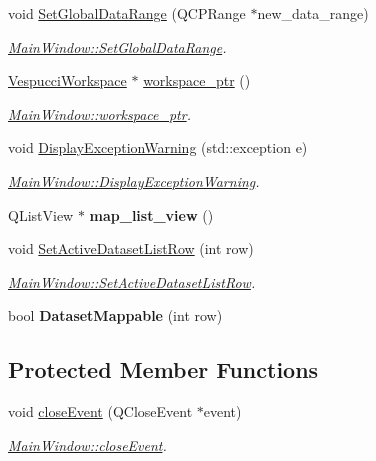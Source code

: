 \begin{DoxyCompactItemize}
void \hyperlink{class_main_window_aa0c431f17d5790a5bfc0e49e429c173b}{Set\+Global\+Data\+Range} (Q\+C\+P\+Range $\ast$new\+\_\+data\+\_\+range)
\begin{DoxyCompactList}\small\item\em \hyperlink{class_main_window_aa0c431f17d5790a5bfc0e49e429c173b}{Main\+Window\+::\+Set\+Global\+Data\+Range}. \end{DoxyCompactList}\item 
\hyperlink{class_vespucci_workspace}{Vespucci\+Workspace} $\ast$ \hyperlink{class_main_window_af78d7dca13e15077306eb27737edb096}{workspace\+\_\+ptr} ()
\begin{DoxyCompactList}\small\item\em \hyperlink{class_main_window_af78d7dca13e15077306eb27737edb096}{Main\+Window\+::workspace\+\_\+ptr}. \end{DoxyCompactList}\item 
void \hyperlink{class_main_window_afe21228ed02306f34b6194cefeeb7feb}{Display\+Exception\+Warning} (std\+::exception e)
\begin{DoxyCompactList}\small\item\em \hyperlink{class_main_window_afe21228ed02306f34b6194cefeeb7feb}{Main\+Window\+::\+Display\+Exception\+Warning}. \end{DoxyCompactList}\item 
\hypertarget{class_main_window_a7a13630a02a40927bfb218078c586f9f}{Q\+List\+View $\ast$ {\bfseries map\+\_\+list\+\_\+view} ()}\label{class_main_window_a7a13630a02a40927bfb218078c586f9f}

\item 
void \hyperlink{class_main_window_a2961ddb7545da22e3bb0df7aca85bae1}{Set\+Active\+Dataset\+List\+Row} (int row)
\begin{DoxyCompactList}\small\item\em \hyperlink{class_main_window_a2961ddb7545da22e3bb0df7aca85bae1}{Main\+Window\+::\+Set\+Active\+Dataset\+List\+Row}. \end{DoxyCompactList}\item 
\hypertarget{class_main_window_ad31a733d5590bebf61af8413b6251a06}{bool {\bfseries Dataset\+Mappable} (int row)}\label{class_main_window_ad31a733d5590bebf61af8413b6251a06}

\end{DoxyCompactItemize}
\subsection*{Protected Member Functions}
\begin{DoxyCompactItemize}
\item 
void \hyperlink{class_main_window_a4e20a4a065fbb0e4d3532a45a0a91425}{close\+Event} (Q\+Close\+Event $\ast$event)
\begin{DoxyCompactList}\small\item\em \hyperlink{class_main_window_a4e20a4a065fbb0e4d3532a45a0a91425}{Main\+Window\+::close\+Event}. \end{DoxyCompactList}\end{DoxyCompactItemize}


